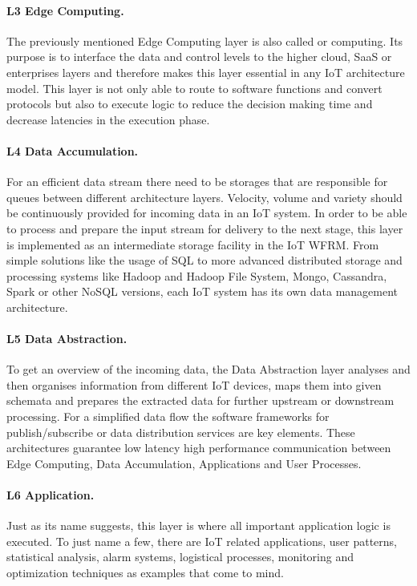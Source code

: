 \paragraph{L3 Edge Computing.}
The previously mentioned Edge Computing layer is also called  or  computing. Its purpose is to interface the data and control levels to the higher cloud, SaaS or enterprises layers and therefore makes this layer essential in any IoT architecture model. This layer is not only able to route to software functions and convert protocols but also to execute logic to reduce the decision making time and decrease latencies in the execution phase.

\paragraph{L4 Data Accumulation.}
For an efficient data stream there need to be storages that are responsible for queues between different architecture layers. Velocity, volume and variety should be continuously provided for incoming data in an IoT system. In order to be able to process and prepare the input stream for delivery to the next stage, this layer is implemented as an intermediate storage facility in the IoT WFRM. From simple solutions like the usage of SQL to more advanced distributed storage and processing systems like Hadoop and Hadoop File System, Mongo, Cassandra, Spark or other NoSQL versions, each IoT system has its own data management architecture.

\paragraph{L5 Data Abstraction.}
To get an overview of the incoming data, the Data Abstraction layer analyses and then organises information from different IoT devices, maps them into given schemata and prepares the extracted data for further upstream or downstream processing. For a simplified data flow the software frameworks for publish/subscribe or data distribution services are key elements. These architectures guarantee low latency high performance communication between Edge Computing, Data Accumulation, Applications and User Processes. 

\paragraph{L6 Application.}
Just as its name suggests, this layer is where all important application logic is executed. To just name a few, there are IoT related applications, user patterns, statistical analysis, alarm systems, logistical processes, monitoring and optimization techniques as examples that come to mind.


